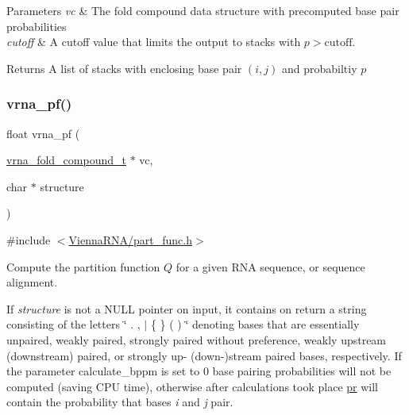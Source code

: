\begin{DoxyParams}{Parameters}
{\em vc} & The fold compound data structure with precomputed base pair probabilities \\
\hline
{\em cutoff} & A cutoff value that limits the output to stacks with $ p > \textrm{cutoff} $. \\
\hline
\end{DoxyParams}
\begin{DoxyReturn}{Returns}
A list of stacks with enclosing base pair $(i,j)$ and probabiltiy $ p $ 
\end{DoxyReturn}
\mbox{\label{group__pf__fold_ga29e256d688ad221b78d37f427e0e99bc}} 
\subsubsection{\texorpdfstring{vrna\+\_\+pf()}{vrna\_pf()}}
{\footnotesize\ttfamily float vrna\+\_\+pf (\begin{DoxyParamCaption}\item[{\hyperlink{group__fold__compound_ga1b0cef17fd40466cef5968eaeeff6166}{vrna\+\_\+fold\+\_\+compound\+\_\+t} $\ast$}]{vc,  }\item[{char $\ast$}]{structure }\end{DoxyParamCaption})}



{\ttfamily \#include $<$\hyperlink{part__func_8h}{Vienna\+R\+N\+A/part\+\_\+func.\+h}$>$}



Compute the partition function $Q$ for a given R\+NA sequence, or sequence alignment. 

If {\itshape structure} is not a N\+U\+LL pointer on input, it contains on return a string consisting of the letters \char`\"{} . , $\vert$ \{ \} ( ) \char`\"{} denoting bases that are essentially unpaired, weakly paired, strongly paired without preference, weakly upstream (downstream) paired, or strongly up-\/ (down-\/)stream paired bases, respectively. If the parameter calculate\+\_\+bppm is set to 0 base pairing probabilities will not be computed (saving C\+PU time), otherwise after calculations took place \hyperlink{fold__vars_8h_ac98ec419070aee6831b44e5c700f090f}{pr} will contain the probability that bases {\itshape i} and {\itshape j} pair.

